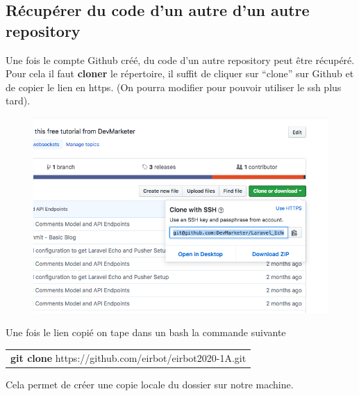 \documentclass[a4paper,10pt]{article}
\begin{document}
\begin{spacing}{1.5}
\subsection*{Récupérer du code d'un autre d'un autre repository}
Une fois le compte Github créé, du code d'un autre
repository peut être récupéré. Pour cela il faut \textbf{cloner} le répertoire,
il suffit de cliquer sur ``clone'' sur Github et de copier le lien en https. (On
pourra modifier pour pouvoir utiliser le ssh plus tard).
\begin{figure}[H]
  \center
  \includegraphics[scale=0.5]{clone.png}
\end{figure}
Une fois le lien copié on tape dans un bash la commande suivante
\begin{center}
  \begin{tabular}{c}
    \rowcolor{lightgray!50!white}
      \textbf{git clone} https://github.com/eirbot/eirbot2020-1A.git
  \end{tabular}
\end{center}
Cela permet de créer une copie locale du dossier sur notre machine.


\end{spacing}
\end{document}
